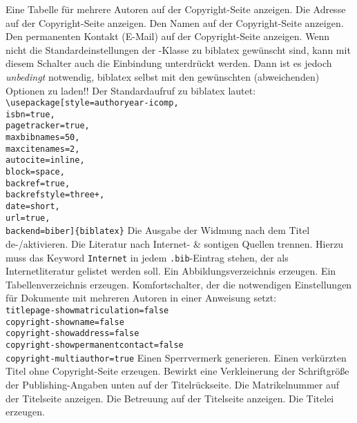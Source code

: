  Eine Tabelle \dfalse für mehrere Autoren auf der Copyright-Seite anzeigen.
 Die Adresse auf der Copyright-Seite anzeigen. \dtrue
{} Den Namen auf der Copyright-Seite anzeigen. \dtrue
{} Den permanenten Kontakt (E-Mail) auf der Copy\-right-Seite anzeigen. \dtrue
{} Wenn nicht \dfalse die Standardeinstellungen der \HSKLbook-Klasse zu biblatex gewünscht sind, kann mit diesem Schalter auch die Einbindung unterdrückt werden. Dann ist es jedoch \emph{unbedingt} notwendig, biblatex selbst mit den gewünschten (abweichenden) Optionen zu laden!! Der Standardaufruf zu biblatex lautet:\\\verb!\usepackage[style=authoryear-icomp,!\\\verb!isbn=true,!\\\verb!pagetracker=true,!\\\verb!maxbibnames=50,!\\\verb!maxcitenames=2,!\\\verb!autocite=inline,!\\\verb!block=space,!\\\verb!backref=true,!\\\verb!backrefstyle=three+,!\\\verb!date=short,!\\\verb!url=true,!\\\verb!backend=biber]{biblatex}!
 Die Ausgabe der Widmung nach dem Titel de-/aktivieren.\dtrue
{} Die \dfalse Literatur nach Internet- \& sontigen Quellen trennen. Hierzu muss das Keyword \verb!Internet! in jedem \verb!.bib!-Eintrag stehen, der als Internetliteratur gelistet werden soll.
 Ein Abbildungsverzeichnis erzeugen. \dtrue
{} Ein Tabellenverzeichnis erzeugen. \dtrue
{} Komfortschalter, \dfalse der die notwendigen Einstellungen für Dokumente mit mehreren Autoren in einer Anweisung setzt:\\\verb!titlepage-showmatriculation=false!\\\verb!copyright-showname=false!\\\verb!copyright-showaddress=false!\\\verb!copyright-showpermanentcontact=false!\\\verb!copyright-multiauthor=true!
 Einen Sperrvermerk generieren. \dfalse
{} Einen verkürzten Titel ohne Copyright-Seite erzeugen. \dfalse
{} Bewirkt eine \dfalse Verkleinerung der Schriftgröße der Publishing-Angaben unten auf der Titelrückseite.
 Die Matrikelnummer auf der Titelseite anzeigen. \dtrue
{} Die Betreuung auf der Titelseite anzeigen. \dtrue
{} Die Titelei erzeugen. \dtrue
